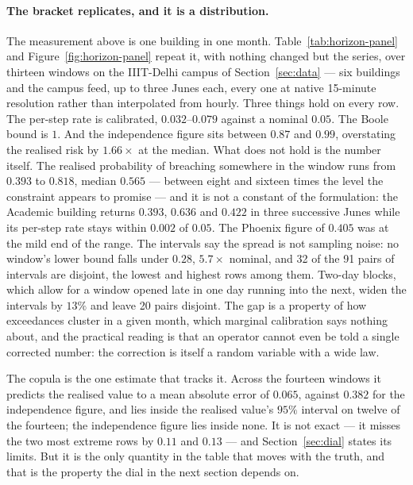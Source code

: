 \paragraph{The bracket replicates, and it is a distribution.} The measurement
above is one building in one month. Table~\ref{tab:horizon-panel} and
Figure~\ref{fig:horizon-panel} repeat it, with nothing changed but the series,
over thirteen windows on the IIIT-Delhi campus of Section~\ref{sec:data} ---
six buildings and the campus feed, up to three Junes each, every one at native
15-minute resolution rather than interpolated from hourly. Three things hold on
every row. The per-step rate is calibrated, $0.032$--$0.079$ against a nominal
$0.05$. The Boole bound is $1$. And the independence figure sits between
$0.87$ and $0.99$, overstating the realised risk by $1.66\times$ at the median.
What does not hold is the number itself. The realised probability of breaching
somewhere in the window runs from $0.393$ to $0.818$, median $0.565$ ---
between eight and sixteen times the level the constraint appears to promise ---
and it is not a constant of the formulation: the Academic building returns
$0.393$, $0.636$ and $0.422$ in three successive Junes while its per-step rate
stays within $0.002$ of $0.05$. The Phoenix figure of $0.405$ was at the mild
end of the range. The intervals say the spread is not sampling noise: no
window's lower bound falls under $0.28$, $5.7\times$ nominal, and 32 of the 91
pairs of intervals are disjoint, the lowest and highest rows among them. Two-day
blocks, which allow for a window opened late in one day running into the next,
widen the intervals by $13\%$ and leave 20 pairs disjoint. The gap is a
property of how exceedances cluster in a given month, which marginal calibration says nothing about, and the practical reading
is that an operator cannot even be told a single corrected number: the
correction is itself a random variable with a wide law.

The copula is the one estimate that tracks it. Across the fourteen windows it
predicts the realised value to a mean absolute error of $0.065$, against
$0.382$ for the independence figure, and lies inside the realised value's
$95\%$ interval on twelve of the fourteen; the independence figure lies inside
none. It is not exact --- it misses the two most extreme rows by $0.11$ and $0.13$ --- and
Section~\ref{sec:dial} states its limits. But it is the only quantity in the
table that moves with the truth, and that is the property the dial in the next
section depends on.

